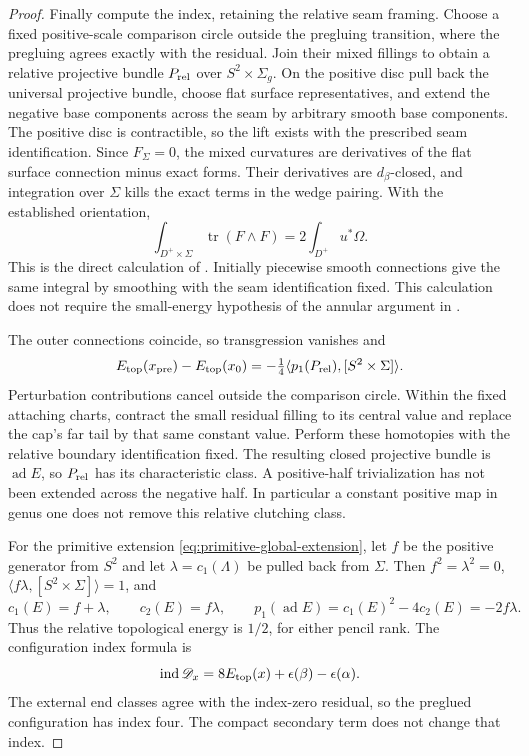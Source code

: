 \documentclass[11pt]{amsart}
\theoremstyle{definition}
\theoremstyle{remark}
\theoremstyle{plain}
\begin{document}
\begin{proof}
Finally compute the index, retaining the relative seam framing.
Choose a fixed positive-scale comparison circle outside the pregluing
transition, where the pregluing agrees exactly with the residual.
Join their mixed fillings to obtain a relative projective bundle
$P_{\rm rel}$ over $S^2\times\Sigma_g$. On the positive disc
pull back the universal projective bundle, choose flat surface
representatives, and extend the negative base components across the
seam by arbitrary smooth base components. The positive disc is
contractible, so the lift exists with the prescribed seam identification.
Since $F_\Sigma=0$, the mixed curvatures are derivatives of the
flat surface connection minus exact forms. Their derivatives are
$d_\beta$-closed, and integration over $\Sigma$ kills the
exact terms in the wedge pairing. With the established orientation,
\begin{equation}\label{eq:gluing-positive-sewing}
       \int_{D^+\times\Sigma}\operatorname{tr}(F\wedge F)
                                         =2\int_{D^+}u^*\Omega.
\end{equation}
This is the direct calculation of
\cite[Lemma~5.10, equation~(5.12)]{DaeFukLip21a}. Initially
piecewise smooth connections give the same integral by smoothing with
the seam identification fixed. This calculation does not require the
small-energy hypothesis of the annular argument in
\cite[Lemma~4.67]{DaeFukLip21b}.

The outer connections coincide, so transgression vanishes and
\[
 E_{\rm top}(x_{\rm pre})-E_{\rm top}(x_0)
                    =-\tfrac14\langle p_1(P_{\rm rel}),[S^2\times\Sigma]\rangle.
\]
Perturbation contributions cancel outside the comparison circle.
Within the fixed attaching charts, contract the small residual filling
to its central value and replace the cap's far tail by that same
constant value. Perform these homotopies with the relative boundary
identification fixed. The resulting closed projective bundle is
$\operatorname{ad}E$, so $P_{\rm rel}$ has its characteristic
class. A positive-half trivialization has not been extended across
the negative half. In particular a constant positive map in genus
one does not remove this relative clutching class.

For the primitive extension \eqref{eq:primitive-global-extension},
let $f$ be the positive generator from $S^2$ and let
$\lambda=c_1(\Lambda)$ be pulled back from $\Sigma$. Then
$f^2=\lambda^2=0$, $\langle f\lambda,[S^2\times\Sigma]\rangle=1$,
and
\begin{equation}\label{eq:gluing-relative-characteristic-class}
        c_1(E)=f+\lambda,\qquad c_2(E)=f\lambda,\qquad
        p_1(\operatorname{ad}E)=c_1(E)^2-4c_2(E)=-2f\lambda.
\end{equation}
Thus the relative topological energy is $1/2$, for either pencil
rank. The configuration index formula
\cite[Proposition~3.20, equation~(3.21)]{DaeFukLip21a} is
\[
             \operatorname{ind}\mathscr D_x
                    =8E_{\rm top}(x)+\epsilon(\beta)-\epsilon(\alpha).
\]
The external end classes agree with the index-zero residual, so
the preglued configuration has index four. The compact secondary
term does not change that index.


\end{proof}
\end{document}
